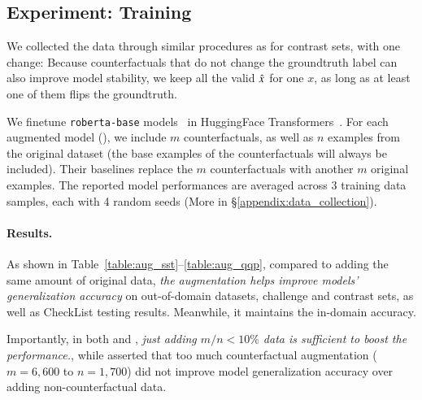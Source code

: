 \subsection{Experiment: Training}
\label{subsec:augmentation}
We collected the data through similar procedures as for contrast sets, with one change:
Because counterfactuals that do not change the groundtruth label can also improve model stability, we keep all the valid $\hat{x}$ for one $x$, as long as at least one of them flips the groundtruth.

We finetune \texttt{roberta-base} models~\cite{liu2019roberta} in HuggingFace Transformers~\cite{Wolf2019HuggingFacesTS}.
For each augmented model (\maug), we include $m$ counterfactuals, as well as $n$ examples from the original dataset (the base examples of the counterfactuals will always be included).
Their baselines \mcomp replace the $m$ counterfactuals with another $m$ original examples.
The reported model performances are averaged across 3 training data samples, each with 4 random seeds (More in \S\ref{appendix:data_collection}).

\paragraph{Results.}
As shown in Table~\ref{table:aug_sst}--\ref{table:aug_qqp}, compared to adding the same amount of original data, \emph{the augmentation helps improve models' generalization accuracy} on out-of-domain datasets, challenge and contrast sets, as well as CheckList testing results.
Meanwhile, it maintains the in-domain accuracy.

Importantly, in both \nli and \qqp, \emph{just adding $m/n < 10\%$ data is sufficient to boost the performance.}, while \citet{huang2020counterfactually} asserted that too much counterfactual augmentation ($m=6,600$ to $n=1,700$) did not improve model generalization accuracy over adding non-counterfactual data.

